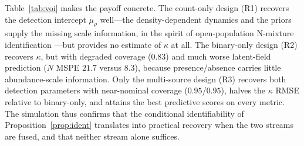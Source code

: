 \documentclass[preprint,12pt]{elsarticle}
\theoremstyle{definition}
\begin{document}
\begin{table}[h!]
\centering\small\renewcommand{\arraystretch}{1.3}
\setlength{\tabcolsep}{6pt}
\caption{Practical parameter recovery and predictive accuracy across
observation regimes ($m=100$, $T=20$, $R=100$). Parenthetic values after each
coverage entry are Monte Carlo standard errors $\sqrt{\hat p(1-\hat p)/R}$; the
RMSE and score columns carry Monte Carlo error equal to the across-replicate
standard deviation divided by $\sqrt{R}$ (Section~\ref{sec:voi-methods}).
Predictive metrics use a common held-out count-and-binary test set. R1 provides no information about
$\kappa$; R2 provides no count-survey estimate of $\rho$. Multi-source
fusion recovers both detection parameters with near-nominal coverage and
attains the best predictive accuracy.}
\label{tab:voi}
\end{table}

Table~\ref{tab:voi} makes the payoff concrete. The count-only design (R1)
recovers the detection intercept $\mu_\rho$ well---the density-dependent
dynamics and the priors supply the missing scale information, in the spirit
of open-population N-mixture identification \citep{dail2011}---but provides
no estimate of $\kappa$ at all. The binary-only design (R2) recovers
$\kappa$, but with degraded coverage ($0.83$) and much worse latent-field
prediction ($N$ MSPE $21.7$ versus $8.3$), because presence/absence carries
little abundance-scale information. Only the multi-source design (R3)
recovers both detection parameters with near-nominal coverage
($0.95$/$0.95$), halves the $\kappa$ RMSE relative to binary-only, and
attains the best predictive scores on every metric. The simulation thus
confirms that the conditional identifiability of
Proposition~\ref{prop:ident} translates into practical recovery when the
two streams are fused, and that neither stream alone suffices.
\end{document}
